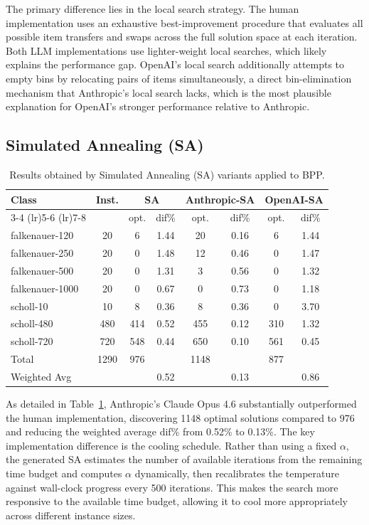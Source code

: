 \documentclass[11pt]{article}
\begin{document}
The primary difference lies in the local search strategy. The human implementation uses an exhaustive best-improvement procedure that evaluates all possible item transfers and swaps across the full solution space at each iteration. Both LLM implementations use lighter-weight local searches, which likely explains the performance gap. OpenAI's local search additionally attempts to empty bins by relocating pairs of items simultaneously, a direct bin-elimination mechanism that Anthropic's local search lacks, which is the most plausible explanation for OpenAI's stronger performance relative to Anthropic.

\subsection{Simulated Annealing (SA)}
\begin{table}[H]
\centering
\caption{Results obtained by Simulated Annealing (SA) variants applied to BPP.}
\label{tab:sa-comparison}
\begin{tabular}{l c cc cc cc}
\toprule
\multirow{2}{*}{Class} & \multirow{2}{*}{Inst.} & \multicolumn{2}{c}{SA} & 
\multicolumn{2}{c}{Anthropic-SA} & \multicolumn{2}{c}{OpenAI-SA} \\
\cmidrule(lr){3-4} \cmidrule(lr){5-6} \cmidrule(lr){7-8}
 & & opt. & dif\% & opt. & dif\% & opt. & dif\% \\
\midrule
falkenauer-120  & 20   & 6    & 1.44 & 20   & 0.16 & 6    & 1.44 \\
falkenauer-250  & 20   & 0    & 1.48 & 12   & 0.46 & 0    & 1.47 \\
falkenauer-500  & 20   & 0    & 1.31 & 3    & 0.56 & 0    & 1.32 \\
falkenauer-1000 & 20   & 0    & 0.67 & 0    & 0.73 & 0    & 1.18 \\
scholl-10       & 10   & 8    & 0.36 & 8    & 0.36 & 0    & 3.70 \\
scholl-480      & 480  & 414  & 0.52 & 455  & 0.12 & 310  & 1.32 \\
scholl-720      & 720  & 548  & 0.44 & 650  & 0.10 & 561  & 0.45 \\
\midrule
Total           & 1290 & 976  &      & 1148 &      & 877  &      \\
Weighted Avg    &      &      & 0.52 &      & 0.13 &      & 0.86 \\
\bottomrule
\end{tabular}
\end{table}

As detailed in Table~\ref{tab:sa-comparison}, Anthropic's Claude Opus 4.6 substantially outperformed the human implementation, 
discovering 1148 optimal solutions compared to 976 and reducing the weighted average 
dif\% from 0.52\% to 0.13\%. The key implementation difference is the cooling 
schedule. Rather than using a fixed $\alpha$, the generated SA estimates the number 
of available iterations from the remaining time budget and computes $\alpha$ 
dynamically, then recalibrates the temperature against wall-clock progress every 500 
iterations. This makes the search more responsive to the available time budget, 
allowing it to cool more appropriately across different instance sizes.
\end{document}
